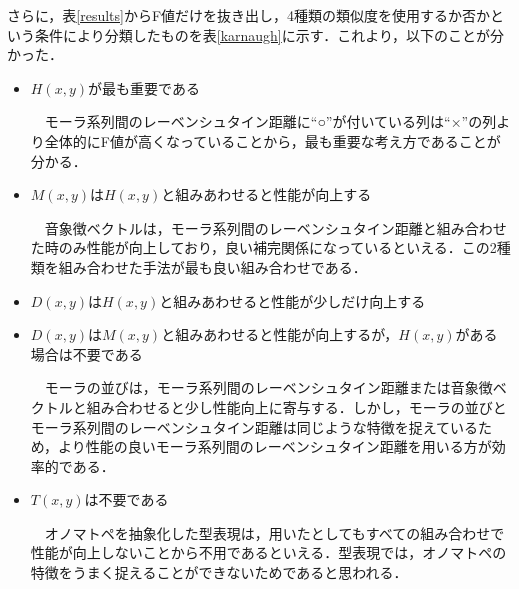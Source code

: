 \documentclass[japanese]{jnlp_1.4}
\newcommand{\addtext}[1]{}
\begin{document}
さらに，表\ref{results}からF値だけを抜き出し，4種類の類似度を使用するか否かという条件により分類したものを表\ref{karnaugh}に示す．これより，以下のことが分かった．

\begin{itemize}
\item $H(x, y)$が最も重要である

　モーラ系列間のレーベンシュタイン距離に``○''が付いている列は``×''の列より全体的にF値が高くなっていることから，最も重要な考え方であることが分かる．

\item $M(x, y)$は$H(x, y)$と組みあわせると性能が向上する

　音象徴ベクトルは，モーラ系列間のレーベンシュタイン距離と組み合わせた時のみ性能が向上しており，良い補完関係になっているといえる．この2種類を組み合わせた手法が最も良い組み合わせである．

\item $D(x, y)$は$H(x, y)$と組みあわせると性能が少しだけ向上する
\item $D(x, y)$は$M(x, y)$と組みあわせると性能が向上するが，$H(x, y)$がある場合は不要である

　モーラの並びは，モーラ系列間のレーベンシュタイン距離または音象徴ベクトルと組み合わせると少し性能向上に寄与する．しかし，モーラの並びとモーラ系列間のレーベンシュタイン距離は同じような特徴を捉えているため，より性能の良いモーラ系列間のレーベンシュタイン距離を用いる方が効率的である．

\item $T(x, y)$は不要である

　オノマトペを抽象化した型表現は，用いたとしてもすべての組み合わせで性能が向上しないことから不用であるといえる．型表現では，オノマトペの特徴をうまく捉えることができないためであると思われる．

\end{itemize}



\addtext{本稿では，日本語を対象にオノマトペの印象推定を行ったが，オノマトペの表記内のモーラ系列間の類似度とオノマトペの表記全体の音象徴ベクトルによる類似度を用いた手法が最も良い推定結果となったことから，他の言語への対応も可能であると考えられる．他の言語では日本語程に多くのオノマトペを頻繁に利用するわけではないが{\cite{Book_03}}，例えば，中国語では日本語と良く似た構造のオノマトペが利用されており，また，英語では日本語で多く見られる反復する形ではないオノマトペが利用されているが，実際に聞こえる音をアルファベットの発音に照らし合わせてオノマトペとして表現するため，日本語と同様の関連性を見出すことができると思われる．}
\end{document}
